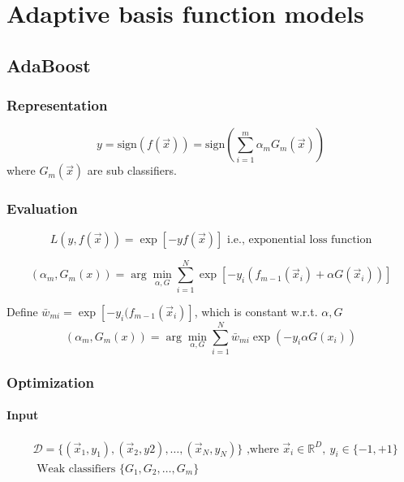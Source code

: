 \chapter{Adaptive basis function models}


\section{AdaBoost}


\subsection{Representation}
\begin{equation}
y=\text{sign}(f(\vec{x}))=\text{sign}\left(\sum\limits_{i=1}^m \alpha_mG_m(\vec{x})\right)
\end{equation}
where $G_m(\vec{x})$ are sub classifiers.


\subsection{Evaluation}
\begin{equation} \nonumber
L(y,f(\vec{x}))=\exp[-yf(\vec{x})] \text{  i.e., exponential loss function}
\end{equation}

\begin{equation}
(\alpha_m,G_m(x))= \arg\min_{\alpha,G} \sum_{i=1}^N \exp{[-y_i(f_{m-1}(\vec{x}_i)+\alpha G(\vec{x}_i))]}
\end{equation}

Define $\bar{w}_{mi}=\exp{[-y_i(f_{m-1}(\vec{x}_i)]}$, which is constant w.r.t. $\alpha, G$
\begin{equation}
(\alpha_m,G_m(x))= \arg\min_{\alpha,G} \sum_{i=1}^N {\bar{w}}_{mi} \exp{(-y_i \alpha G(x_i))}
\end{equation}


\subsection{Optimization}


\subsubsection{Input}
\begin{eqnarray*}
& \mathcal{D}=\{(\vec{x}_1,y_1),(\vec{x}_2,y2),\dots,(\vec{x}_N,y_N)\} \text{ ,where } \vec{x}_i \in \mathbb{R}^D,\ y_i \in \{-1,+1\} \\
& \text{ Weak classifiers } \{G_1,G_2,\dots,G_m\}
\end{eqnarray*}


